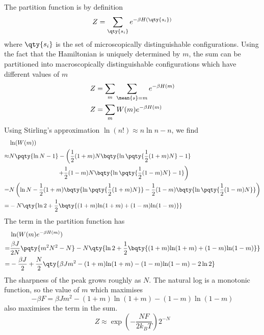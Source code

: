 \documentclass[12pt]{article}
\begin{document}
        \subsubsection{} The partition function is by definition \[
            Z = \sum_{\qty{s_i}} e^{ - \beta H(\qty{s_i})}
        \]
        where \(\qty{s_i}\) is the set of microscopically distinguishable configurations. Using the fact that the Hamiltonian is uniquely determined by \(m\), the sum can be partitioned into macroscopically distinguishable configurations which have different values of \(m\) \begin{align*}
            Z &=  \sum_{m} \sum_{\mean{s} = m} e^{ - \beta H(m)}\\
            Z &=  \sum_{m} W(m) e^{ - \beta H(m)}
        \end{align*}
        Using Stirling's approximation \(\ln(n!) \approx n\ln n - n\), we find \begin{align*}
            &\ln(W(m))\\
            \approx& N\pqty{\ln N - 1} -\left( \frac{1}{2}(1 + m)N \bqty{\ln\pqty{\frac{1}{2}(1 + m)N} - 1} \right.\\
            &\qquad\qquad\qquad\qquad\left. +\frac{1}{2}(1 - m)N \bqty{\ln\pqty{\frac{1}{2}(1 - m)N} - 1}\right)\\
            =& N \left(\ln N - \frac{1}{2}(1 + m) \bqty{\ln\pqty{\frac{1}{2}(1 + m)N}} -\frac{1}{2}(1 - m) \bqty{\ln\pqty{\frac{1}{2}(1 - m)N}}\right)\\
            =& - N \qty{ \ln 2 + \frac{1}{2}\bqty{(1 + m) {\ln(1 + m)} +(1 - m) {\ln(1 - m)}}}
        \end{align*}
        The term in the partition function has \begin{align*}
            & \ln(W(m)e^{ -\beta H(m)}) \\ 
            =&  \frac{\beta J}{2N}\pqty{m^2N^2 - N}- N \qty{ \ln 2 + \frac{1}{2}\bqty{(1 + m) {\ln(1 + m)} +(1 - m) {\ln(1 - m)}}}\\
            =&  -\frac{\beta J}{2} + \frac{N}{2} \qty{ { \beta J m^2 - (1 + m) {\ln(1 + m)} -(1 - m) {\ln(1 - m)}} - 2\ln 2}
        \end{align*}
        The sharpness of the peak grows roughly as \(N\). The natural log is a monotonic function, so the value of \(m\) which maximises \[
            - \beta F = { \beta J m^2 - (1 + m) {\ln(1 + m)} -(1 - m) {\ln(1 - m)}}
        \]
        also maximises the term in the sum.
        \[
            Z \approx \exp(- \frac{NF}{2k_BT} ) 2^{ - N}
        \]
        \begin{figure}[H]
            \centering
        \end{figure}
\end{document}
